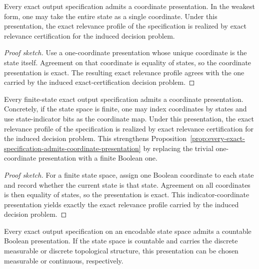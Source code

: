 \begin{proposition}\label{prop:every-exact-specification-admits-coordinate-presentation}
Every exact output specification admits a coordinate presentation. In the weakest form, one may take the entire state as a single coordinate. Under this presentation, the exact relevance profile of the specification is realized by exact relevance certification for the induced decision problem.
\end{proposition}

\begin{proof}[Proof sketch]
Use a one-coordinate presentation whose unique coordinate is the state itself. Agreement on that coordinate is equality of states, so the coordinate presentation is exact. The resulting exact relevance profile agrees with the one carried by the induced exact-certification decision problem.
\end{proof}

\begin{proposition}\label{prop:finite-specifications-admit-coordinate-presentations}
Every finite-state exact output specification admits a coordinate presentation. Concretely, if the state space is finite, one may index coordinates by states and use state-indicator bits as the coordinate map. Under this presentation, the exact relevance profile of the specification is realized by exact relevance certification for the induced decision problem. This strengthens Proposition~\ref{prop:every-exact-specification-admits-coordinate-presentation} by replacing the trivial one-coordinate presentation with a finite Boolean one.
\end{proposition}

\begin{proof}[Proof sketch]
For a finite state space, assign one Boolean coordinate to each state and record whether the current state is that state. Agreement on all coordinates is then equality of states, so the presentation is exact. This indicator-coordinate presentation yields exactly the exact relevance profile carried by the induced decision problem.
\end{proof}

\begin{proposition}\label{prop:countable-specifications-admit-countable-boolean-presentations}
Every exact output specification on an encodable state space admits a countable Boolean presentation. If the state space is countable and carries the discrete measurable or discrete topological structure, this presentation can be chosen measurable or continuous, respectively.
\end{proposition}

